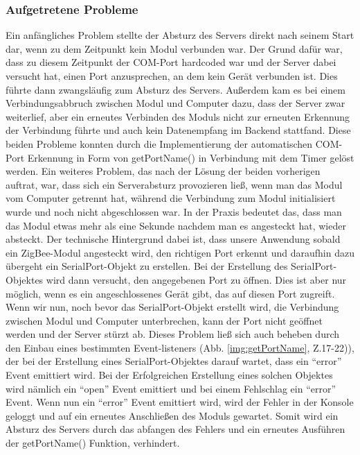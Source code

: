\documentclass[]{article}
\begin{document}
			\subsubsection{Aufgetretene Probleme}
			Ein anfängliches Problem stellte der Absturz des Servers direkt nach seinem Start dar, wenn zu dem Zeitpunkt kein Modul verbunden war. Der Grund dafür war, dass zu diesem Zeitpunkt der COM-Port hardcoded war und der Server dabei versucht hat, einen Port anzusprechen, an dem kein Gerät verbunden ist. Dies führte dann zwangsläufig zum Absturz des Servers. Außerdem kam es bei einem Verbindungsabbruch zwischen Modul und Computer dazu, dass der Server zwar weiterlief, aber ein erneutes Verbinden des Moduls nicht zur erneuten Erkennung der Verbindung führte und auch kein Datenempfang im Backend stattfand.\newline
Diese beiden Probleme konnten durch die Implementierung der automatischen COM-Port Erkennung in Form von getPortName() in Verbindung mit dem Timer gelöst werden.\newline
Ein weiteres Problem, das nach der Lösung der beiden vorherigen auftrat, war, dass sich ein Serverabsturz provozieren ließ, wenn man das Modul vom Computer getrennt hat, während die Verbindung zum Modul initialisiert wurde und noch nicht abgeschlossen war. In der Praxis bedeutet das, dass man das Modul etwas mehr als eine Sekunde nachdem man es angesteckt hat, wieder absteckt. Der technische Hintergrund dabei ist, dass unsere Anwendung sobald ein ZigBee-Modul angesteckt wird, den richtigen Port erkennt und daraufhin dazu übergeht ein SerialPort-Objekt zu erstellen. Bei der Erstellung des SerialPort-Objektes wird dann versucht, den angegebenen Port zu öffnen. Dies ist aber nur möglich, wenn es ein angeschlossenes Gerät gibt, das auf diesen Port zugreift. Wenn wir nun, noch bevor das SerialPort-Objekt erstellt wird, die Verbindung zwischen Modul und Computer unterbrechen, kann der Port nicht geöffnet werden und der Server stürzt ab.\newline  
Dieses Problem ließ sich auch beheben durch den Einbau eines bestimmten Event-listeners (Abb. \ref{img:getPortName}, Z.17-22)), der bei der Erstellung eines SerialPort-Objektes darauf wartet, dass ein “error” Event emittiert wird. Bei der Erfolgreichen Erstellung eines solchen Objektes wird nämlich ein “open” Event emittiert und bei einem Fehlschlag ein “error” Event. Wenn nun ein “error” Event emittiert wird, wird der Fehler in der Konsole geloggt und auf ein erneutes Anschließen des Moduls gewartet. Somit wird ein Absturz des Servers durch das abfangen des Fehlers und ein erneutes Ausführen der getPortName() Funktion, verhindert.
\end{document}
